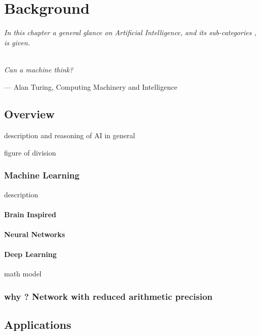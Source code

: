 \chapter{Background}
\textit{In this chapter a general glance on Artificial Intelligence, and its sub-categories , is given.}\\\\


\epigraph{ \textit{Can a machine think?}}{--- \textup{Alan Turing}, Computing Machinery and Intelligence}

\section{Overview}

description and reasoning of AI in general 

figure of division 

\subsection{Machine Learning}
 description 
 
 \subsubsection{Brain Inspired}
 
\subsubsection{Neural Networks}

\subsubsection{Deep Learning}

 math model 
 
 


\subsection{ why ? Network with reduced arithmetic precision }
\section{Applications}

